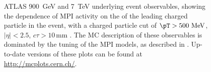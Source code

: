 \begin{figure}[tp]
  \caption{ATLAS 900~GeV and 7~TeV underlying event observables, showing
    the dependence of MPI activity on the \pT of the leading charged
    particle in the event, with a charged particle \pT cut of
    $\pT > 500~\text{MeV}$, $|\eta| < 2.5$, $c\tau > 10\,\text{mm}$
    \cite{Aad:2010fh}. The MC description of
    these observables is dominated by the tuning of the MPI models, as
    described in . Up-to-date versions of
    these plots can be found at \url{http://mcplots.cern.ch/}.}
  \label{fig:cmp:mpi-ue-atlas-1}
\end{figure}

